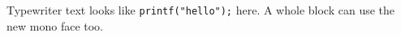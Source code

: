 \documentclass{article}
\begin{document}
Typewriter text looks like \texttt{printf("hello");} here.
{\ttfamily A whole block can use the new mono face too.}
\end{document}
